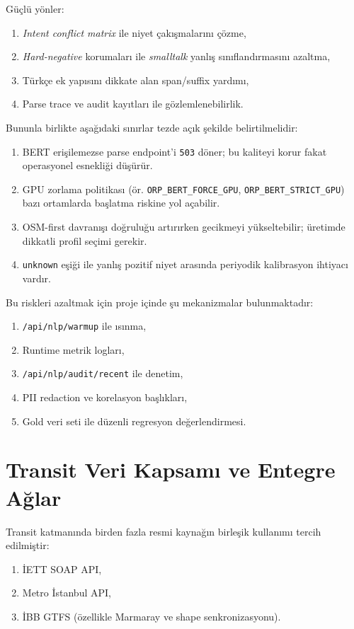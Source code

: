 Güçlü yönler:
\begin{enumerate}
    \item \textit{Intent conflict matrix} ile niyet çakışmalarını çözme,
    \item \textit{Hard-negative} korumaları ile \textit{smalltalk} yanlış sınıflandırmasını azaltma,
    \item Türkçe ek yapısını dikkate alan span/suffix yardımı,
    \item Parse trace ve audit kayıtları ile gözlemlenebilirlik.
\end{enumerate}

Bununla birlikte aşağıdaki sınırlar tezde açık şekilde belirtilmelidir:
\begin{enumerate}
    \item BERT erişilemezse parse endpoint'i \texttt{503} döner; bu kaliteyi korur fakat operasyonel esnekliği düşürür.
    \item GPU zorlama politikası (ör. \texttt{ORP\_BERT\_FORCE\_GPU}, \texttt{ORP\_BERT\_STRICT\_GPU}) bazı ortamlarda başlatma riskine yol açabilir.
    \item OSM-first davranışı doğruluğu artırırken gecikmeyi yükseltebilir; üretimde dikkatli profil seçimi gerekir.
    \item \texttt{unknown} eşiği ile yanlış pozitif niyet arasında periyodik kalibrasyon ihtiyacı vardır.
\end{enumerate}

Bu riskleri azaltmak için proje içinde şu mekanizmalar bulunmaktadır:
\begin{enumerate}
    \item \texttt{/api/nlp/warmup} ile ısınma,
    \item Runtime metrik logları,
    \item \texttt{/api/nlp/audit/recent} ile denetim,
    \item PII redaction ve korelasyon başlıkları,
    \item Gold veri seti ile düzenli regresyon değerlendirmesi.
\end{enumerate}

\section{Transit Veri Kapsamı ve Entegre Ağlar}

Transit katmanında birden fazla resmi kaynağın birleşik kullanımı tercih edilmiştir:
\begin{enumerate}
    \item İETT SOAP API,
    \item Metro İstanbul API,
    \item İBB GTFS (özellikle Marmaray ve shape senkronizasyonu).
\end{enumerate}

